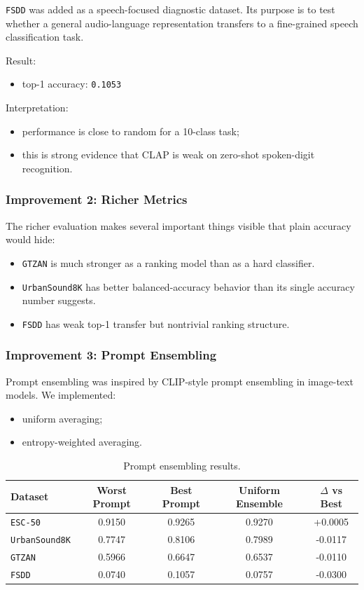 \documentclass[11pt]{article}
\newcommand{\dataset}[1]{\texttt{#1}}
\begin{document}
\dataset{FSDD} was added as a speech-focused diagnostic dataset. Its purpose is
to test whether a general audio-language representation transfers to a
fine-grained speech classification task.

Result:
\begin{itemize}[leftmargin=1.25em]
  \item top-1 accuracy: \dataset{0.1053}
\end{itemize}

Interpretation:
\begin{itemize}[leftmargin=1.25em]
  \item performance is close to random for a 10-class task;
  \item this is strong evidence that CLAP is weak on zero-shot spoken-digit
  recognition.
\end{itemize}

\subsubsection*{Improvement 2: Richer Metrics}

The richer evaluation makes several important things visible that plain
accuracy would hide:
\begin{itemize}[leftmargin=1.25em]
  \item \dataset{GTZAN} is much stronger as a ranking model than as a hard
  classifier.
  \item \dataset{UrbanSound8K} has better balanced-accuracy behavior than its
  single accuracy number suggests.
  \item \dataset{FSDD} has weak top-1 transfer but nontrivial ranking
  structure.
\end{itemize}

\subsubsection*{Improvement 3: Prompt Ensembling}

Prompt ensembling was inspired by CLIP-style prompt ensembling in image-text
models. We implemented:
\begin{itemize}[leftmargin=1.25em]
  \item uniform averaging;
  \item entropy-weighted averaging.
\end{itemize}

\begin{table}[H]
\centering
\small
\begin{tabular}{lcccc}
\toprule
Dataset & Worst Prompt & Best Prompt & Uniform Ensemble & $\Delta$ vs Best \\
\midrule
\dataset{ESC-50} & 0.9150 & 0.9265 & 0.9270 & +0.0005 \\
\dataset{UrbanSound8K} & 0.7747 & 0.8106 & 0.7989 & -0.0117 \\
\dataset{GTZAN} & 0.5966 & 0.6647 & 0.6537 & -0.0110 \\
\dataset{FSDD} & 0.0740 & 0.1057 & 0.0757 & -0.0300 \\
\bottomrule
\end{tabular}
\caption{Prompt ensembling results.}
\end{table}
\end{document}
